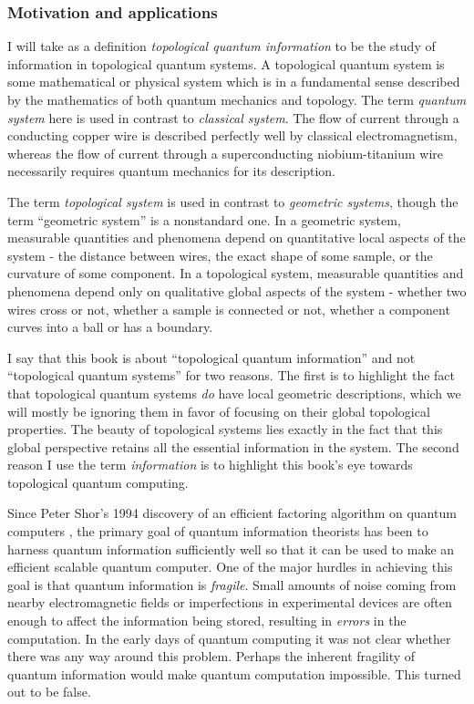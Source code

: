 \documentclass{article}
\theoremstyle{definition}
\numberwithin{figure}{section}
\begin{document}
\subsubsection{Motivation and applications}

I will take as a definition \textit{topological quantum information} to be the study of information in topological quantum systems. A topological quantum system is some mathematical or physical system which is in a fundamental sense described by the mathematics of both quantum mechanics and topology. The term \textit{quantum system} here is used in contrast to \textit{classical system}. The flow of current through a conducting copper wire is described perfectly well by classical electromagnetism, whereas the flow of current through a superconducting niobium-titanium wire necessarily requires quantum mechanics for its description.

The term \textit{topological system} is used in contrast to \textit{geometric systems}, though the term “geometric system” is a nonstandard one. In a geometric system, measurable quantities and phenomena depend on quantitative local aspects of the system - the distance between wires, the exact shape of some sample, or the curvature of some component. In a topological system, measurable quantities and phenomena depend only on qualitative global aspects of the system - whether two wires cross or not, whether a sample is connected or not, whether a component curves into a ball or has a boundary.

I say that this book is about “topological quantum information” and not “topological quantum systems” for two reasons. The first is to highlight the fact that topological quantum systems \textit{do} have local geometric descriptions, which we will mostly be ignoring them in favor of focusing on their global topological properties. The beauty of topological systems lies exactly in the fact that this global perspective retains all the essential information in the system. The second reason I use the term \textit{information} is to highlight this book’s eye towards topological quantum computing. 

Since Peter Shor’s 1994 discovery of an efficient factoring algorithm on quantum computers \cite{shor1994algorithms}, the primary goal of quantum information theorists has been to harness quantum information sufficiently well so that it can be used to make an efficient scalable quantum computer. One of the major hurdles in achieving this goal is that quantum information is \textit{fragile}. Small amounts of noise coming from nearby electromagnetic fields or imperfections in experimental devices are often enough to affect the information being stored, resulting in \textit{errors} in the computation. In the early days of quantum computing it was not clear whether there was any way around this problem. Perhaps the inherent fragility of quantum information would make quantum computation impossible. This turned out to be false.
\end{document}
